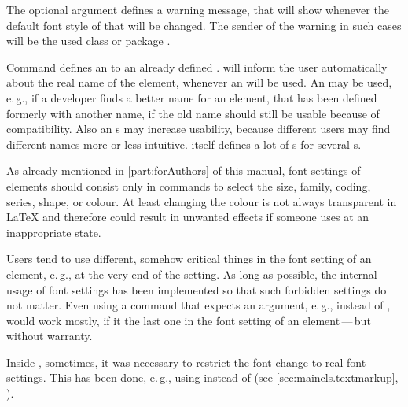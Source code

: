 The optional argument  defines a warning message,
that \KOMAScript{} will show whenever the default font style of that
 will be changed. The sender of the warning in such cases will
be the used \KOMAScript{} class or package .

Command  defines an  to an already
defined . \KOMAScript{} will inform the user automatically
about the real name of the element, whenever an  will be
used. An  may be used, e.\,g., if a
developer finds a better name for an element, that has been defined formerly
with another name, if the old name should still be usable because of
compatibility. Also an s may increase usability, because
different users may find different names more or less intuitive. \KOMAScript{}
itself defines a lot of s for several s.
%
\EndIndexGroup


\begin{Declaration}
\end{Declaration}
As already mentioned in \autoref{part:forAuthors} of this manual, font
settings of elements should consist only in commands to select the size,
family, coding, series, shape, or colour. At least changing the colour is not
always transparent in \LaTeX{} and therefore could result in unwanted effects
if someone uses  at an inappropriate state.

Users tend to use different, somehow critical things in the font setting of an
element, e.\,g.,  at the very end of the setting. As long
as possible, the internal usage of font settings has been implemented so that
such forbidden settings do not matter. Even using a command that expects an
argument, e.\,g.,  instead of ,  would work
mostly, if it the last one in the font setting of an element\,---\,but without
warranty.

Inside \KOMAScript, sometimes, it was necessary to restrict the font change to
real font settings. This has been done, e.\,g., using
%
%
%
%
 instead of 
(see \autoref{sec:maincls.textmarkup},
).

